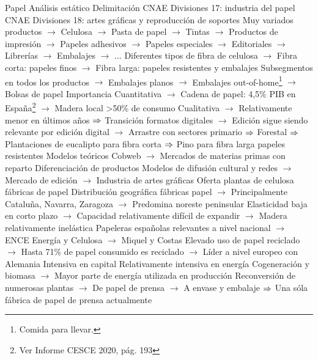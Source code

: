 \documentclass{nuevotema}
\begin{document}
\begin{esquemal}
	\1 
		\2 Papel
			\3 Análisis estático
				\4 Delimitación
				\4[] CNAE Divisiones 17: industria del papel
				\4[] CNAE Divisiones 18: artes gráficas y reproducción de soportes
				\4[] Muy variados productos
				\4[] $\to$ Celulosa
				\4[] $\to$ Pasta de papel
				\4[] $\to$ Tintas
				\4[] $\to$ Productos de impresión
				\4[] $\to$ Papeles adhesivos
				\4[] $\to$ Papeles especiales
				\4[] $\to$ Editoriales
				\4[] $\to$ Librerías
				\4[] $\to$ Embalajes
				\4[] $\to$ ...
				\4[] Diferentes tipos de fibra de celulosa
				\4[] $\to$ Fibra corta: papeles finos
				\4[] $\to$ Fibra larga: papeles resistentes y embalajes
				\4[] Subsegmentos en todos los productos
				\4[] $\to$ Embalajes planos
				\4[] $\to$ Embalajes out-of-home\footnote{Comida para llevar.}
				\4[] $\to$ Bolsas de papel
				\4 Importancia
				\4[] Cuantitativa
				\4[] $\to$ Cadena de papel: 4,5\% PIB en España\footnote{Ver Informe CESCE 2020, pág. 193}
				\4[] $\to$ Madera local >50\% de consumo
				\4[] Cualitativa
				\4[] $\to$ Relativamente menor en últimos años
				\4[] $\Rightarrow$ Transición formatos digitales
				\4[] $\to$ Edición sigue siendo relevante por edición digital
				\4[] $\to$ Arrastre con sectores primario
				\4[] $\Rightarrow$ Forestal
				\4[] $\Rightarrow$ Plantaciones de eucalipto para fibra corta
				\4[] $\Rightarrow$ Pino para fibra larga papeles resistentes
				\4 Modelos teóricos
				\4[] Cobweb
				\4[] $\to$ Mercados de materias primas con reparto
				\4[] Diferenciación de productos
				\4[] Modelos de difusión cultural y redes
				\4[] $\to$ Mercado de edición
				\4[] $\to$ Industria de artes gráficas
				\4 Oferta
				 plantas de celulosa
				 fábricas de papel
				\4[] Distribución geográfica fábricas papel
				\4[] $\to$ Principalmente Cataluña, Navarra, Zaragoza
				\4[] $\to$ Predomina noreste peninsular
				\4[] Elasticidad baja en corto plazo
				\4[] $\to$ Capacidad relativamente difícil de expandir
				\4[] $\to$ Madera relativamente inelástica
				\4[] Papeleras españolas relevantes a nivel nacional
				\4[] $\to$ ENCE Energía y Celulosa
				\4[] $\to$ Miquel y Costas
				\4[] Elevado uso de papel reciclado
				\4[] $\to$ Hasta 71\% de papel consumido es reciclado
				\4[] $\to$ Líder a nivel europeo con Alemania
				\4[] Intensiva en capital
				\4[] Relativamente intensiva en energía
				\4[] Cogeneración y biomasa
				\4[] $\to$ Mayor parte de energía utilizada en producción
				\4[] Reconversión de numerosas plantas
				\4[] $\to$ De papel de prensa
				\4[] $\to$ A envase y embalaje
				\4[] $\Rightarrow$ Una sóla fábrica de papel de prensa actualmente

\end{esquemal}
\end{document}

